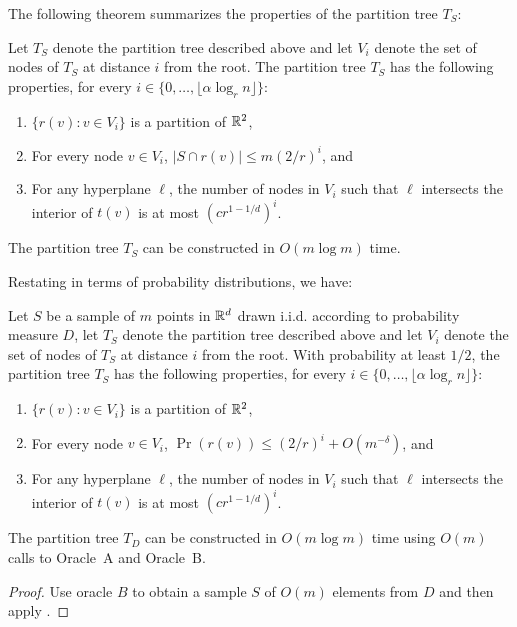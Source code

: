 \documentclass{patmorin}
\begin{document}
The following theorem summarizes the properties of the partition tree $T_S$:

\begin{thm}[Matou\v{s}ek 1992]
Let $T_S$ denote the partition tree described above and let $V_i$
denote the set of nodes of $T_S$ at distance $i$ from the root.
The partition tree $T_S$ has the following properties, for every
$i\in\{0,\ldots,\lfloor\alpha\log_r n\rfloor\}$:
\begin{enumerate}
  \item $\{r(v) : v\in V_i\}$ is a partition of $\mathbb{R}^2$,  
  \item For every node $v\in V_i$, $|S\cap r(v)| \le m(2/r)^i$, and 
  \item For any hyperplane $\ell$, the number of nodes in $V_i$ such that
       $\ell$ intersects the interior of $t(v)$ is at most
       $(cr^{1-1/d})^i$.
\end{enumerate}
The partition tree $T_S$ can be constructed in $O(m\log m)$ time.
\end{thm}

Restating  in terms of probability distributions,
we have:

\begin{thm}
Let $S$ be a sample of $m$ points in $\mathbb{R}^d$ drawn i.i.d. according to
probability measure $D$, let $T_S$ denote the partition tree described
above and let $V_i$ denote the set of nodes of $T_S$ at distance $i$ from
the root.  With probability at least $1/2$, the partition tree $T_S$ has
the following properties, for every $i\in\{0,\ldots,\lfloor\alpha\log_r
n\rfloor\}$:
\begin{enumerate}
  \item $\{r(v) : v\in V_i\}$ is a partition of $\mathbb{R}^2$,  
  \item For every node $v\in V_i$, $\Pr(r(v)) \le (2/r)^i+O(m^{-\delta})$, 
        and 
  \item For any hyperplane $\ell$, the number of nodes in $V_i$ such that
       $\ell$ intersects the interior of $t(v)$ is at most
       $(cr^{1-1/d})^i$.
\end{enumerate}
The partition tree $T_D$ can be constructed in $O(m\log m)$ time using 
$O(m)$ calls to Oracle~A and Oracle~B.
\end{thm}

\begin{proof}
Use oracle $B$ to obtain a sample $S$ of $O(m)$ elements from $D$ and
then apply .
\end{proof}
\end{document}
